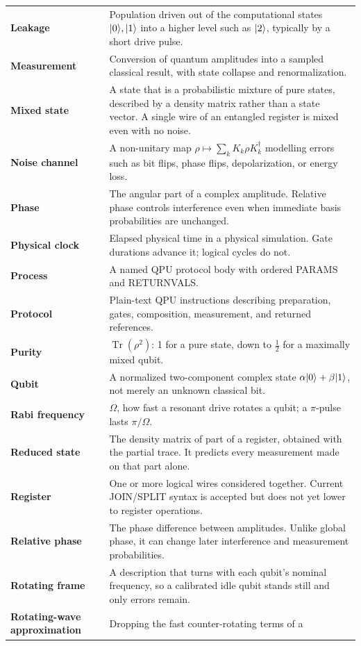 \begin{longtable}{>{\bfseries}p{}p{}}
Leakage & Population driven out of the computational states $\lvert 0\rangle,\lvert 1\rangle$
into a higher level such as $\lvert 2\rangle$, typically by a short drive pulse.\\
Measurement & Conversion of quantum amplitudes into a sampled classical result,
with state collapse and renormalization.\\
Mixed state & A state that is a probabilistic mixture of pure states,
described by a density matrix rather than a state vector. A single wire of an
entangled register is mixed even with no noise.\\
Noise channel & A non-unitary map $\rho\mapsto\sum_kK_k\rho K_k^\dagger$ modelling
errors such as bit flips, phase flips, depolarization, or energy loss.\\
Phase & The angular part of a complex amplitude. Relative phase controls
interference even when immediate basis probabilities are unchanged.\\
Physical clock & Elapsed physical time in a physical simulation. Gate
durations advance it; logical cycles do not.\\
Process & A named QPU protocol body with ordered PARAMS and RETURNVALS.\\
Protocol & Plain-text QPU instructions describing preparation, gates,
composition, measurement, and returned references.\\
Purity & $\operatorname{Tr}(\rho^2)$: 1 for a pure state, down to
$\tfrac12$ for a maximally mixed qubit.\\
Qubit & A normalized two-component complex state
$\alpha\lvert 0\rangle+\beta\lvert 1\rangle$, not merely an unknown classical bit.\\
Rabi frequency & $\Omega$, how fast a resonant drive rotates a qubit; a
$\pi$-pulse lasts $\pi/\Omega$.\\
Reduced state & The density matrix of part of a register, obtained with
the partial trace. It predicts every measurement made on that part alone.\\
Register & One or more logical wires considered together. Current JOIN/SPLIT
syntax is accepted but does not yet lower to register operations.\\
Relative phase & The phase difference between amplitudes. Unlike global phase,
it can change later interference and measurement probabilities.\\
Rotating frame & A description that turns with each qubit's nominal
frequency, so a calibrated idle qubit stands still and only errors remain.\\
Rotating-wave approximation & Dropping the fast counter-rotating terms of a

\end{longtable}
